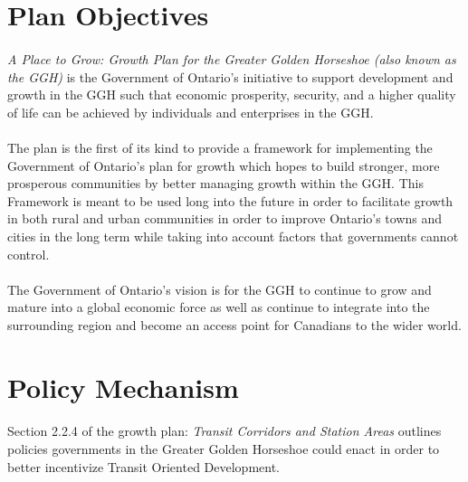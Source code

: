 \documentclass[12pt]{book}
\title{\coursetitle\linebreak\lecturename}
\author{\\Cain Susko\\ 
           \\ \\ \\
      Queen's University 
    \\School of Computing\\}
\begin{document}
\begin{titlepage}
        \maketitle
\end{titlepage}


\section*{Plan Objectives}
\paragraph*{}
\textit{A Place to Grow: Growth Plan for the Greater Golden Horseshoe (also known as the GGH)} is the Government of Ontario's initiative
to support development and growth in the GGH such that economic prosperity, security, and a higher quality of life
can be achieved by individuals and enterprises in the GGH.

\paragraph*{}
The plan is the first of its kind to provide a framework for implementing the Government of Ontario's plan for growth 
which hopes to build stronger, more prosperous communities by better managing growth within the GGH. This Framework
is meant to be used long into the future in order to facilitate growth in both rural and urban communities in order to 
improve Ontario's towns and cities in the long term while taking into account factors that governments cannot control.

\paragraph*{}
The Government of Ontario's vision is for the GGH to continue to grow and mature into a global economic force as well as
continue to integrate into the surrounding region and become an access point for Canadians to the wider world.


\section*{Policy Mechanism}
\paragraph*{}
Section 2.2.4 of the growth plan: \textit{Transit Corridors and Station Areas} outlines policies governments in the Greater Golden Horseshoe
could enact in order to better incentivize Transit Oriented Development. 
\end{document}

